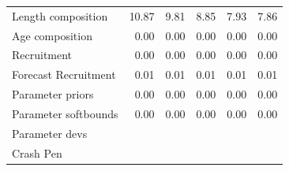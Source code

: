 \documentclass[12pt,]{article}
\begin{document}
\begin{landscape}
\begin{table}[ht]
\begin{tabular}{lrrrrr}
  Length composition & 10.87 & 9.81 & 8.85 & 7.93 & 7.86 \\ 
  Age composition & 0.00 & 0.00 & 0.00 & 0.00 & 0.00 \\ 
  Recruitment & 0.00 & 0.00 & 0.00 & 0.00 & 0.00 \\ 
  Forecast Recruitment & 0.01 & 0.01 & 0.01 & 0.01 & 0.01 \\ 
  Parameter priors & 0.00 & 0.00 & 0.00 & 0.00 & 0.00 \\ 
  Parameter softbounds & 0.00 & 0.00 & 0.00 & 0.00 & 0.00 \\ 
  Parameter devs &  &  &  &  &  \\ 
  Crash Pen &  &  &  &  &  \\ 
   \hline
\end{tabular}
\end{table}
\end{landscape}

\newpage
\end{document}
